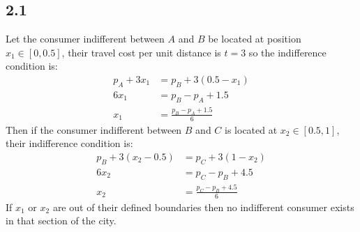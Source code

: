 \documentclass{article}
\begin{document}
\subsection*{2.1}
Let the consumer indifferent between $A$ and $B$ be located at position $x_{1} \in [0, 0.5]$, their travel cost per unit distance is $t=3$ so the indifference condition is:
\begin{align*}
    p_{A} + 3x_{1} &= p_{B} + 3(0.5 - x_{1})\\
    6x_{1} &= p_{B} - p_{A} + 1.5\\
    x_{1} &= \frac{p_{B} - p_{A} + 1.5}{6}
\end{align*}
Then if the consumer indifferent between $B$ and $C$ is located at $x_{2} \in [0.5, 1]$, their indifference condition is:
\begin{align*}
    p_{B} + 3(x_{2} - 0.5) &= p_{C} + 3(1 - x_{2})\\
    6x_{2} &= p_{C} - p_{B} + 4.5\\
    x_{2} &= \frac{p_{C} - p_{B} + 4.5}{6}
\end{align*}
If $x_{1}$ or $x_{2}$ are out of their defined boundaries then no indifferent consumer exists in that section of the city.
\end{document}

